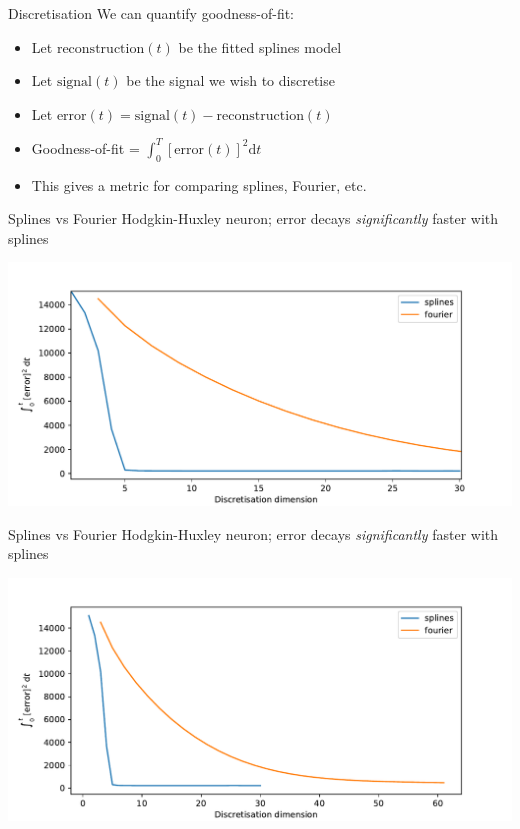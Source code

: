 \documentclass[presentation]{beamer}
\begin{document}
\begin{frame}[<+->][label={sec:org178a1cb}]{Discretisation}
We can quantify goodness-of-fit:
\begin{itemize}
\item Let \(\mathrm{reconstruction}(t)\) be the fitted splines model
\item Let \(\mathrm{signal}(t)\) be the signal we wish to discretise
\item Let \(\mathrm{error}(t) = \mathrm{signal}(t) - \mathrm{reconstruction}(t)\)
\item Goodness-of-fit = \(\int_0^T\left[\mathrm{error}(t)\right]^2\mathrm{d}t\)
\item This gives a metric for comparing splines, Fourier, etc.
\end{itemize}
\end{frame}

\begin{frame}[label={sec:org859e380}]{Splines vs Fourier}
Hodgkin-Huxley neuron; error decays \emph{significantly} faster with splines
\begin{center}
\includegraphics[width=.9\linewidth]{./HHerror2.pdf}
\end{center}
\end{frame}

\begin{frame}[label={sec:org710ddd9}]{Splines vs Fourier}
Hodgkin-Huxley neuron; error decays \emph{significantly} faster with splines
\begin{center}
\includegraphics[width=.9\linewidth]{./HHerror.pdf}
\end{center}
\end{frame}
\end{document}
